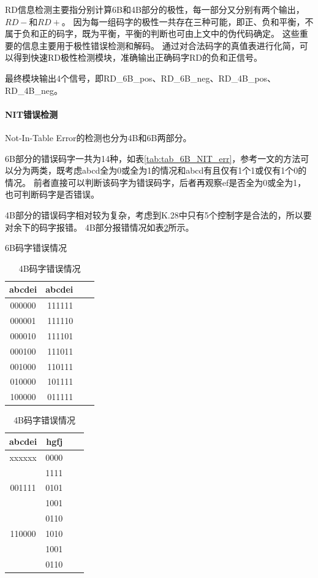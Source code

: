 \documentclass[UTF8]{ctexart}
\begin{document}
RD信息检测主要指分别计算6B和4B部分的极性，每一部分又分别有两个输出，$RD-$和$RD+$。
因为每一组码字的极性一共存在三种可能，即正、负和平衡，不属于负和正的码字，既为平衡，平衡的判断也可由上文中的伪代码确定。
这些重要的信息主要用于极性错误检测和解码。
通过对合法码字的真值表进行化简，可以得到快速RD极性检测模块，准确输出正确码字RD的负和正信号。

最终模块输出4个信号，即RD\_6B\_pos、RD\_6B\_neg、RD\_4B\_pos、RD\_4B\_neg。

\paragraph{NIT错误检测}

Not-In-Table Error的检测也分为4B和6B两部分。

6B部分的错误码字一共为14种，如表\ref{tab:tab_6B_NIT_err}，参考\cite{Widmer1983}一文的方法可以分为两类，既考虑abcd全为0或全为1的情况和abcd有且仅有1个1或仅有1个0的情况。
前者直接可以判断该码字为错误码字，后者再观察ef是否全为0或全为1，也可判断码字是否错误。

4B部分的错误码字相对较为复杂，考虑到K.28中只有5个控制字是合法的，所以要对余下的码字报错。
4B部分报错情况如表\ref{tab:tab_4B_NIT_err}所示。

\begin{table}[H]
\begin{minipage}[t]{.5\textwidth}
\centering
\caption{6B码字错误情况}
\label{tab:tab_6B_NIT_err}
\begin{tabular}{|c|r|r|r|}
\hline
	abcdei	&	abcdei	\\
\hline
	000000	&	111111	\\
	000001	&	111110	\\
	000010	&	111101	\\
	000100	&	111011	\\
	001000	&	110111	\\
	010000	&	101111	\\
	100000	&	011111	\\
\hline
\end{tabular}
\end{minipage}
\begin{minipage}[t]{.5\textwidth}
\centering
\caption{4B码字错误情况}
\label{tab:tab_4B_NIT_err}
\begin{tabular}{|c|r|r|r|}
\hline
	abcdei	&	hgfj	\\
\hline
	xxxxxx	&	0000	\\
			&	1111	\\
\hline
	001111	&	0101	\\
			&	1001	\\
			&	0110	\\
\hline
	110000	&	1010	\\
			&	1001	\\
			&	0110	\\
\hline
\end{tabular}
\end{minipage}
\end{table}
\end{document}
